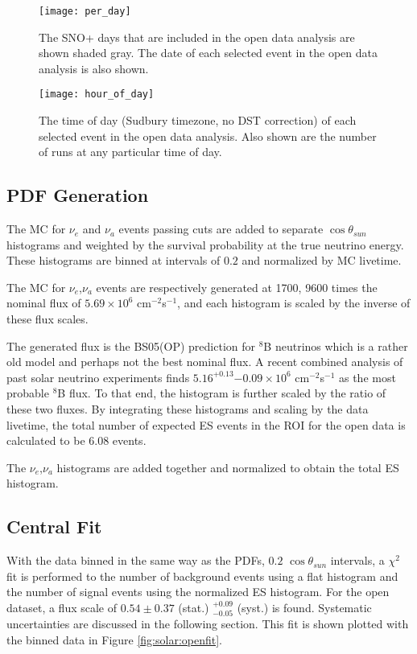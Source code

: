 \begin{figure}
\centering
\texttt{[image: per\_day]}
\caption{The SNO+ days that are included in the open data analysis are shown
         shaded gray.
         The date of each selected event in the open data analysis is also shown.}
\label{fig:solar:opendata}
\end{figure}


\begin{figure}
\centering
\texttt{[image: hour\_of\_day]}
\caption{The time of day (Sudbury timezone, no DST correction) of each selected
         event in the open data analysis.
         Also shown are the number of runs at any particular time of day.}
\label{fig:solar:tod}
\end{figure}

\subsection{PDF Generation}

The MC for $\nu_e$ and $\nu_a$ events passing cuts are added to separate
$\cos{\theta_{sun}}$ histograms and weighted by the survival probability at the
true neutrino energy.
These histograms are binned at intervals of $0.2$ and normalized by MC livetime.

The MC for $\nu_e$,$\nu_a$ events are respectively generated at 1700, 9600 times
the nominal flux of $5.69\times10^{6}$ cm$^{-2}$s$^{-1}$, and each histogram is
scaled by the inverse of these flux scales.

The generated flux is the BS05(OP) prediction for $^8$B neutrinos which is a
rather old model and perhaps not the best nominal flux. 
A recent combined analysis of past solar neutrino experiments finds 
$5.16^{+0.13}{-0.09}\times10^6$ cm$^{-2}$s$^{-1}$ \cite{GlobalSolarFlux} as the 
most probable $^8$B flux.
To that end, the histogram is further scaled by the ratio of these two fluxes.
By integrating these histograms and scaling by the data livetime, the total
number of expected ES events in the ROI for the open data is calculated to be
$6.08$ events.

The $\nu_e$,$\nu_a$ histograms are added together and normalized to obtain the
total ES histogram.

\subsection{Central Fit}

With the data binned in the same way as the PDFs, $0.2$ $\cos{\theta_{sun}}$ intervals, a
$\chi^2$ fit is performed to the number of background events using a flat
histogram and the number of signal events using the normalized ES histogram.
For the open dataset, a flux scale of $0.54\pm0.37$ (stat.) $^{+0.09}_{-0.05}$ 
(syst.) is found.
Systematic uncertainties are discussed in the following section.
This fit is shown plotted with the binned data in Figure \ref{fig:solar:openfit}.

